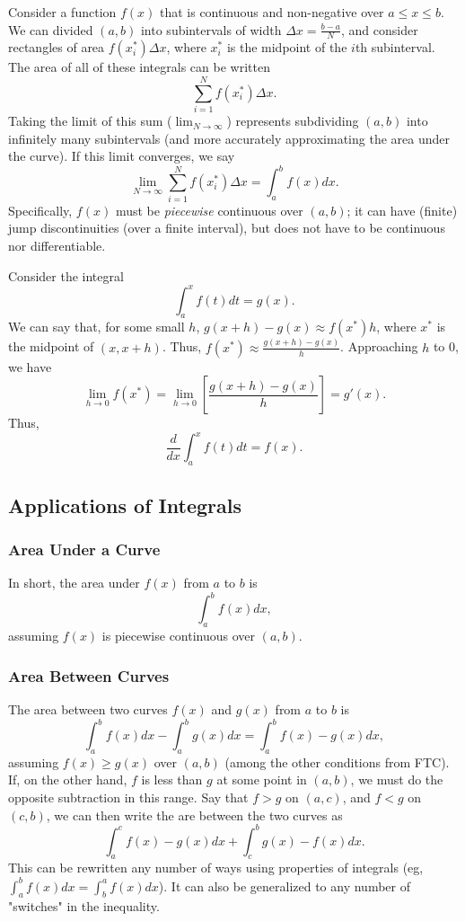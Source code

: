 \documentclass[12pt]{article}
\begin{document}
Consider a function $f(x)$ that is continuous and non-negative over $a \leq x \leq b$. We can divided $(a,b)$ into subintervals of width $\Delta x = \frac{b-a}{N}$, and consider rectangles of area $f(x^{*}_i) \Delta x$, where $x^{*}_i$ is the midpoint of the $i$th subinterval. The area  of all of these integrals can be written \[\sum_{i = 1}^N f(x^{*}_i) \Delta x.\] Taking the limit of this sum ($\lim_{N \to \infty}$) represents subdividing $(a,b)$ into infinitely many subintervals (and more accurately approximating the area under the curve). If this limit converges, we say \[\lim_{N \to \infty} \sum_{i = 1}^N f(x^{*}_i) \Delta x = \int_a^b f(x) dx.\] Specifically, $f(x)$ must be \textit{piecewise} continuous over $(a,b)$; it can have (finite) jump discontinuities (over a finite interval), but does not have to be continuous nor differentiable. 

Consider the integral \[\int_a^x f(t) dt = g(x).\] We can say that, for some small $h$, $g(x + h) - g(x) \approx f(x^*) h$, where $x^*$ is the midpoint of $(x, x+h)$. Thus, $f(x^*) \approx \frac{g(x+h) - g(x)}{h}$. Approaching $h$ to 0, we have \[\lim_{h \to 0} f(x^*) = \lim_{h \to 0} \left[\frac{g(x+h) - g(x)}{h}\right] = g'(x).\] Thus, \[\frac{d}{dx} \int_a^x f(t) dt = f(x).\]
\subsection{Applications of Integrals}
\subsubsection{Area Under a Curve}

In short, the area under $f(x)$ from $a$ to $b$ is \[\int_a^b f(x) dx,\] assuming $f(x)$ is piecewise continuous over $(a,b)$.

\subsubsection{Area Between Curves}

The area between two curves $f(x)$ and $g(x)$ from $a$ to $b$ is \[\int_a^b f(x) dx - \int_a^b g(x) dx = \int_a^b f(x) - g(x) dx,\] assuming $f(x) \geq g(x)$ over $(a,b)$ (among the other conditions from FTC). If, on the other hand, $f$ is less than $g$ at some point in $(a,b)$, we must do the opposite subtraction in this range. Say that $f > g$ on $(a,c)$, and $f < g$ on $(c,b)$, we can then write the are between the two curves as \[\int_a^c f(x) - g(x) dx + \int_c^b g(x) - f(x) dx.\] This can be rewritten any number of ways using properties of integrals (eg, $\int_a^b f(x) dx = \int_b^a f(x) dx$). It can also be generalized to any number of "switches" in the inequality.
\end{document}
